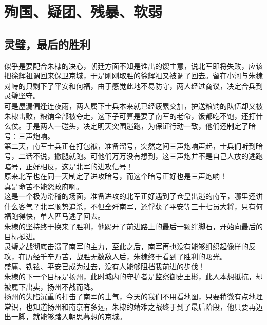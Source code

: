 \section{殉国、疑团、残暴、软弱}
\ifnum{}
	\begin{multicols}{\theparacolNo}
\fi
\subsection{灵璧，最后的胜利}
似乎是要配合朱棣的决心，朝廷方面不知是谁出的馊主意，说北军即将失败，应该把徐辉祖调回来保卫京城，于是刚刚取胜的徐辉祖又被调了回去。留在小河与朱棣对峙的只剩下了平安和何福，由于感觉此地不易防守，两人经过商议，决定合兵到灵璧坚守。\\

可是屋漏偏逢连夜雨，两人属下士兵本来就已经疲累交加，护送粮饷的队伍却又被朱棣击败，粮饷全部被夺走，这下子可算是要了南军的老命，饭都吃不饱，还打什么仗。于是两人一碰头，决定明天突围逃跑，为保证行动一致，他们还制定了暗号：三声炮响。\\

第二天，南军士兵正在打包袱，准备溜号，突然之间三声炮响声起，士兵们听到暗号，二话不说，撒腿就跑。可他们万万没有想到，这三声炮并不是自己人放的逃跑暗号，正好相反，这是北军的进攻信号！\\

原来北军也在同一天制定了进攻暗号，而这个暗号正好也是三声炮响！\\

真是命苦不能怨政府啊。\\

这是一个极为滑稽的场面，准备进攻的北军正好遇到了仓皇出逃的南军，哪里还讲什么客气？北军顺势追杀，不但全歼南军，还俘获了平安等三十七员大将，只有何福跑得快，单人匹马逃了回去。\\

朱棣的坚持终于换来了胜利，他踢开了前进路上的最后一颗绊脚石，开始向最后的目标挺进。\\

灵璧之战彻底击溃了南军的主力，至此之后，南军再也没有能够组织起像样的反攻，在历经千辛万苦，战胜无数敌人后，朱棣终于看到了胜利的曙光。\\

盛庸、铁铉、平安已成为过去，没有人能够阻挡我前进的步伐！\\

朱棣的下一个目标是扬州，此时城内的守护者是监察御史王彬，此人本想抵抗，却被属下出卖，扬州不战而降。\\

扬州的失陷沉重的打击了南军的士气，今天的我们不用看地图，只要稍微有点地理常识，也知道扬州和南京有多远，朱棣的靖难之战终于到了最后阶段，他只要再迈出一脚，就能够踏入朝思暮想的京城。\\


\end{multicols}
